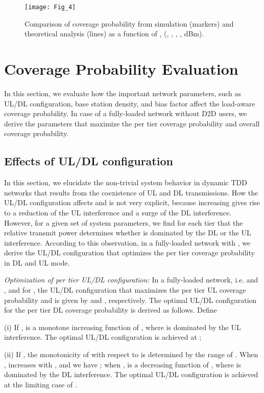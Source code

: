 \documentclass[twocolumn,english]{IEEEtran}
\theoremstyle{plain}
\theoremstyle{definition}
\begin{document}
\begin{figure}[t]
\centering\texttt{[image: Fig\_4]}

\protect\caption{\label{fig:Cove_q_ds}Comparison of coverage probability from simulation
(markers) and theoretical analysis (lines) as a function of ,
(, ,
,
,  dBm).}
\end{figure}



\section{Coverage Probability Evaluation}

In this section, we evaluate how the important network parameters,
such as UL/DL configuration, base station density, and bias factor
affect the load-aware coverage probability. In case of a fully-loaded
network without D2D users, we derive the parameters that maximize
the per tier coverage probability and overall coverage probability.


\subsection{Effects of UL/DL configuration}

In this section, we elucidate the non-trivial system behavior in dynamic
TDD networks that results from the coexistence of UL and DL transmissions.
How the UL/DL configuration  affects\emph{ }
and  is not very explicit, because increasing
 gives rise to a reduction of the UL interference
and a surge of the DL interference. However, for a given set of system
parameters, we find for each tier  that the relative transmit
power  determines whether 
is dominated by the DL or the UL interference. According to this observation,
in a fully-loaded network with , we
derive the UL/DL configuration that optimizes the per tier coverage
probability in DL and UL mode.

\emph{Optimization of per tier UL/DL configuration:} In a fully-loaded
network, i.e.  and ,
and for , the UL/DL configuration
that maximizes the per tier UL coverage probability 
and  is given by 
and , respectively. The optimal
UL/DL configuration for the per tier DL coverage probability is derived
as follows. Define 

(i) If ,
 is a monotone increasing function of
, where  is dominated
by the UL interference. The optimal UL/DL configuration is achieved
at ;

(ii) If ,
the monotonicity of  with respect to
 is determined by the range of .
When , 
increases with , and we have ;
when , 
is a decreasing function of , where 
is dominated by the DL interference. The optimal UL/DL configuration
is achieved at the limiting case of .
\end{document}
